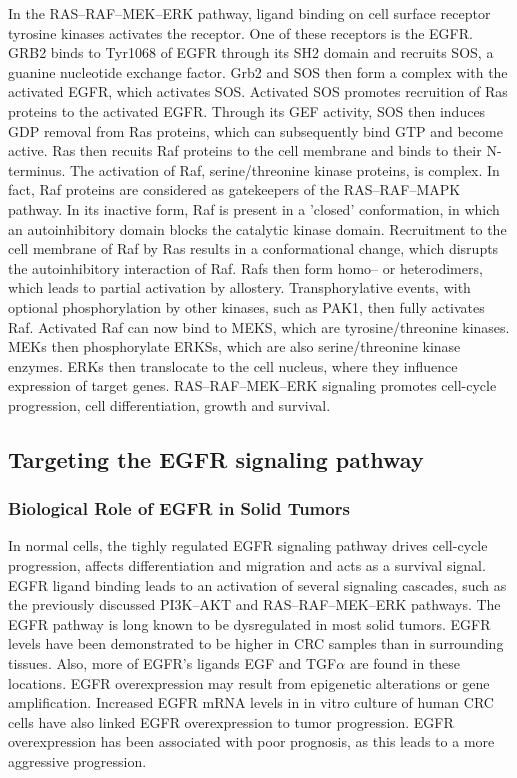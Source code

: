 {{{      In the RAS--RAF--MEK--ERK pathway, ligand binding on cell surface receptor
      tyrosine kinases activates the receptor. One of these receptors is the
      EGFR. GRB2 binds to Tyr1068 of EGFR through its SH2 domain
      and recruits SOS, a guanine nucleotide exchange factor. Grb2 and SOS then
      form a complex with the activated EGFR, which activates SOS. Activated SOS
      promotes recruition of Ras proteins to the activated EGFR. Through its GEF
      activity, SOS then induces GDP removal from Ras proteins, which can
      subsequently bind GTP and become active. Ras then recuits Raf proteins to
      the cell membrane and binds to their N-terminus. The activation of Raf,
      serine/threonine kinase proteins, is complex. In fact, Raf proteins are
      considered as gatekeepers of the RAS--RAF--MAPK pathway. In its inactive
      form, Raf is present in a 'closed' conformation, in which an
      autoinhibitory domain blocks the catalytic kinase domain. Recruitment to
      the cell membrane of Raf by Ras results in a conformational change, which
      disrupts the autoinhibitory interaction of Raf. Rafs then form homo-- or
      heterodimers, which leads to partial activation by allostery.
      Transphorylative events, with optional phosphorylation by other kinases,
      such as PAK1, then fully activates Raf. Activated Raf can now bind to
      MEKS, which are tyrosine/threonine kinases. MEKs then phosphorylate ERKSs,
      which are also serine/threonine kinase enzymes. ERKs then translocate to
      the cell nucleus, where they influence expression of target genes.
      RAS--RAF--MEK--ERK signaling promotes cell-cycle progression, cell
      differentiation, growth and survival.

  \subsection{Targeting the EGFR signaling pathway}

    \subsubsection{Biological Role of EGFR in Solid Tumors}

      In normal cells, the tighly regulated EGFR signaling pathway drives
      cell-cycle progression, affects differentiation and migration and acts as
      a survival signal. EGFR ligand binding leads to an activation of several
      signaling cascades, such as the previously discussed PI3K--AKT and
      RAS--RAF--MEK--ERK pathways. The EGFR pathway is long known to be
      dysregulated in most solid tumors. EGFR levels have been demonstrated to
      be higher in CRC samples than in surrounding tissues. Also, more of EGFR's
      ligands EGF and TGF$\alpha$ are found in these locations. EGFR
      overexpression may result from epigenetic alterations or gene
      amplification. Increased EGFR mRNA levels in in vitro culture of human CRC
      cells have also linked EGFR overexpression to tumor progression. EGFR
      overexpression has been associated with poor prognosis, as this leads to a
      more aggressive progression.

}}}
